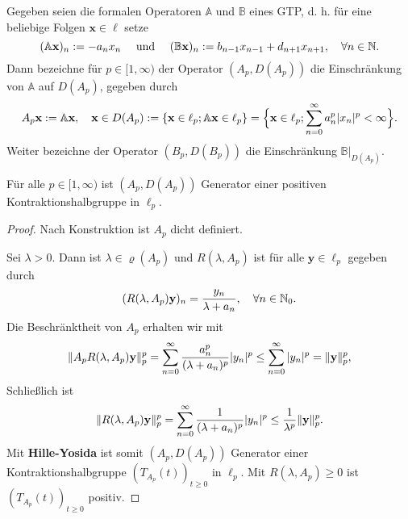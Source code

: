 \begin{konstr}
Gegeben seien die formalen Operatoren $\mathbb A$ und $\mathbb B$ eines GTP, d. h. für eine beliebige  Folgen $\textbf{x}\in \ell$ setze
\begin{equation*}
(\mathbb A\textbf{x})_n:=-a_nx_n\quad\text{ und }\quad (\mathbb B\textbf{x})_n:=b_{n-1}x_{n-1} + d_{n+1}x_{n+1},\quad\forall n\in\mathbb{N}.
\end{equation*}
Dann bezeichne für  $p\in[1,\infty)$ der Operator $(A_p, D(A_p))$  die Einschränkung von $\mathbb A$ auf $D(A_p)$, gegeben durch
\begin{equation*}
A_p\textbf{x} := \mathbb A\textbf{x}, \quad \textbf{x}\in D(A_p):= \{\textnormal{\textbf{x}}\in \ell_p; \mathbb A\textnormal{\textbf{x}}\in \ell_p\}=\Big\{\textnormal{\textbf{x}}\in \ell_p; \sum_{n=0}^\infty a_n^p |x_n|^p < \infty \Big\}.
\end{equation*}
Weiter bezeichne der Operator $(B_p, D(B_p))$ die Einschränkung $\mathbb B|_{D(A_p)}$.
\end{konstr}

\begin{prop}\label{A_p Generator einer Kontraktionshalbgruppe}
Für alle $p\in[1,\infty)$ ist $(A_p, D(A_p))$ Generator einer positiven Kontraktionshalbgruppe in $\ell_p$.
\end{prop}

\begin{proof}
\par 
Nach Konstruktion ist $A_p$ dicht definiert. 

\par
Sei $\lambda>0$. Dann ist $\lambda\in \varrho(A_p)$ und $R(\lambda, A_p)$ ist für alle $\textbf{y}\in\ell_p$ gegeben durch
\begin{equation*}
(R(\lambda, A_p)\textnormal{\index{}\textbf y})_n = \frac{y_n}{\lambda + a_n},\quad \forall n\in\N_0.
\end{equation*}
Die Beschränktheit von $A_p$ erhalten wir mit
\begin{equation*}
\|A_pR(\lambda, A_p)\textnormal{\index{}\textbf y}\|_p^p = \sum_{n=0}^\infty \frac{a_n^p}{(\lambda +  a_n)^p}|y_n|^p\leq\sum_{n=0}^\infty |y_n|^p=\|\textbf{y}\|_p^p,
\end{equation*}
Schließlich ist
\begin{equation*}
\|R(\lambda, A_p)\textnormal{\index{}\textbf y}\|_p^p = \sum_{n=0}^\infty \frac{1}{(\lambda + a_n)^p}|y_n|^p \leq \frac{1}{\lambda^p}\|\textnormal{\index{}\textbf y}\|_p^p.
\end{equation*}
Mit \textbf{Hille-Yosida} ist somit $(A_p, D(A_p))$ Generator einer Kontraktionshalbgruppe $(T_{A_p}(t))_{t\geq0}$ in $\ell_p$. Mit $R(\lambda, A_p)\geq0$ ist $(T_{A_p}(t))_{t\geq0}$ positiv.
\end{proof}


